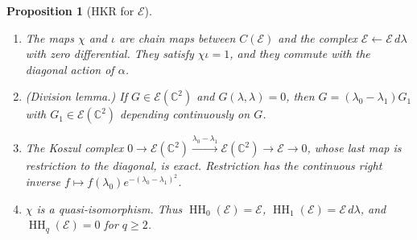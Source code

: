 \documentclass[11pt,oneside,reqno]{article}
\DeclareMathOperator{\HH}{HH}
\newcommand{\C}{\mathbb C}
\newcommand{\cE}{\mathcal E}
\theoremstyle{plain}
\newtheorem{proposition}[theorem]{Proposition}
\theoremstyle{definition}
\theoremstyle{remark}
\begin{document}
\begin{proposition}[HKR for \(\cE\)]\label{prop:HKRE}
\begin{enumerate}
\item[(a)] The maps \(\chi\) and \(\iota\) are chain maps between
\(C(\cE)\) and the complex \(\cE\leftarrow\cE\,d\lambda\) with zero
differential. They satisfy \(\chi\iota=1\), and they commute with the
diagonal action of \(\alpha\).
\item[(b)] \emph{(Division lemma.)} If \(G\in\cE(\C^2)\) and
\(G(\lambda,\lambda)=0\), then \(G=(\lambda_0-\lambda_1)G_1\) with
\(G_1\in\cE(\C^2)\) depending continuously on \(G\).
\item[(c)] The Koszul complex \(0\to\cE(\C^2)\xrightarrow{\lambda_0-\lambda_1}
\cE(\C^2)\to\cE\to0\), whose last map is restriction to the diagonal, is
exact. Restriction has the continuous right inverse
\(f\mapsto f(\lambda_0)e^{-(\lambda_0-\lambda_1)^2}\).
\item[(d)] \(\chi\) is a quasi-isomorphism. Thus
\(\HH_0(\cE)=\cE\), \(\HH_1(\cE)=\cE\,d\lambda\), and \(\HH_q(\cE)=0\) for
\(q\geq2\).
\end{enumerate}
\end{proposition}
\end{document}
